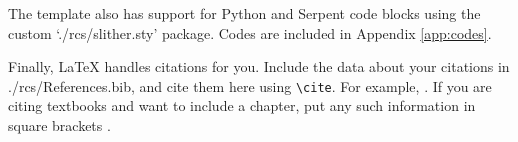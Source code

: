 The template also has support for Python and Serpent code blocks using the custom `./rcs/slither.sty' package. Codes are included in Appendix \ref{app:codes}.

Finally, LaTeX handles citations for you. Include the data about your citations in ./rcs/References.bib, and cite them here using \verb|\cite|. For example, \cite{RootMS}. If you are citing textbooks and want to include a chapter, put any such information in square brackets \cite[Ch. 6]{Lamarsh}.